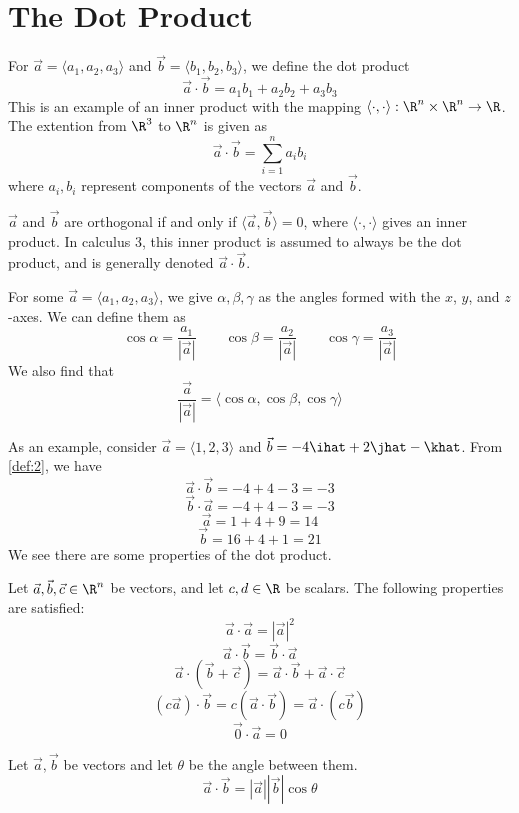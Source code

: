 \section{The Dot Product}
\begin{definition}\label{def:2}
	For $\vec{a}=\langle a_1,a_2,a_3\rangle$ and $\vec{b}=\langle b_1,b_2,b_3\rangle$, we define the dot product
	$$\vec{a}\cdot\vec{b}=a_1b_1+a_2b_2+a_3b_3$$
	This is an example of an inner product with the mapping $\langle\cdot,\cdot\rangle:\R^n\times\R^n\rightarrow\R$. The extention from $\R^3$ to $\R^n$ is given as
	$$\vec{a}\cdot\vec{b}=\sum_{i=1}^n a_ib_i$$
	where $a_i,b_i$ represent components of the vectors $\vec{a}$ and $\vec{b}$.
\end{definition}
\begin{definition}\label{def:3}
	$\vec{a}$ and $\vec{b}$ are orthogonal if and only if $\langle\vec{a},\vec{b}\rangle=0$, where $\langle\cdot,\cdot\rangle$ gives an inner product. In calculus 3, this inner product is assumed to always be the dot product, and is generally denoted $\vec{a}\cdot\vec{b}$.
\end{definition}
\begin{definition}\label{def:4}
	For some $\vec{a}=\langle a_1,a_2,a_3\rangle$, we give $\alpha,\beta,\gamma$ as the angles formed with the $x$, $y$, and $z$-axes. We can define them as
	$$\cos\alpha=\frac{a_1}{|\vec{a}|}\qquad\cos\beta=\frac{a_2}{|\vec{a}|}\qquad\cos\gamma=\frac{a_3}{|\vec{a}|}$$
	We also find that
	$$\frac{\vec{a}}{|\vec{a}|}=\langle\cos\alpha,\cos\beta,\cos\gamma\rangle$$
\end{definition}
As an example, consider $\vec{a}=\langle1,2,3\rangle$ and $\vec{b}=-4\ihat+2\jhat-\khat$. From \ref{def:2}, we have
$$\vec{a}\cdot\vec{b}=-4+4-3=-3$$
$$\vec{b}\cdot\vec{a}=-4+4-3=-3$$
$$\vec{a}=1+4+9=14$$
$$\vec{b}=16+4+1=21$$
We see there are some properties of the dot product.
\begin{theorem}\label{thm:2}
	Let $\vec{a},\vec{b},\vec{c}\in\R^n$ be vectors, and let $c,d\in\R$ be scalars. The following properties are satisfied:
	$$\vec{a}\cdot\vec{a}=|\vec{a}|^2$$
	$$\vec{a}\cdot\vec{b}=\vec{b}\cdot\vec{a}$$
	$$\vec{a}\cdot(\vec{b}+\vec{c})=\vec{a}\cdot\vec{b}+\vec{a}\cdot\vec{c}$$
	$$(c\vec{a})\cdot\vec{b}=c(\vec{a}\cdot\vec{b})=\vec{a}\cdot(c\vec{b})$$
	$$\vec{0}\cdot\vec{a}=0$$
\end{theorem}
\begin{theorem}\label{thm:3}
	Let $\vec{a},\vec{b}$ be vectors and let $\theta$ be the angle between them.
	$$\vec{a}\cdot\vec{b}=|\vec{a}||\vec{b}|\cos\theta$$
\end{theorem}
